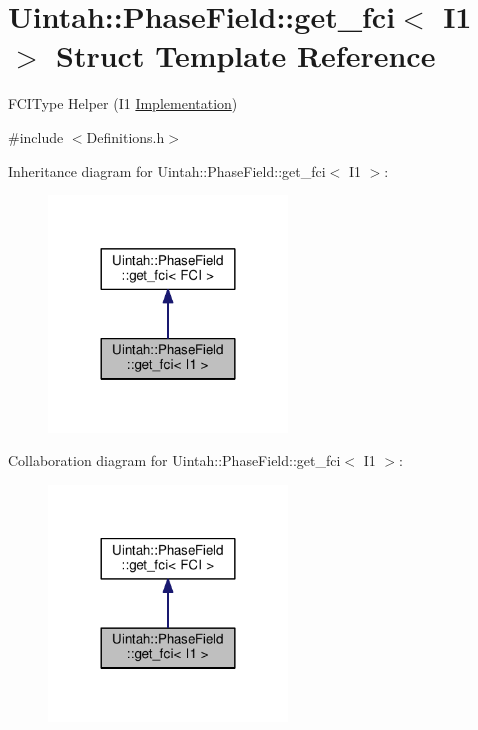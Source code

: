 \hypertarget{structUintah_1_1PhaseField_1_1get__fci_3_01I1_01_4}{}\section{Uintah\+:\+:Phase\+Field\+:\+:get\+\_\+fci$<$ I1 $>$ Struct Template Reference}
\label{structUintah_1_1PhaseField_1_1get__fci_3_01I1_01_4}


F\+C\+I\+Type Helper (I1 \hyperlink{classUintah_1_1PhaseField_1_1Implementation}{Implementation})  




{\ttfamily \#include $<$Definitions.\+h$>$}



Inheritance diagram for Uintah\+:\+:Phase\+Field\+:\+:get\+\_\+fci$<$ I1 $>$\+:\nopagebreak
\begin{figure}[H]
\begin{center}
\leavevmode
\includegraphics[width=180pt]{structUintah_1_1PhaseField_1_1get__fci_3_01I1_01_4__inherit__graph}
\end{center}
\end{figure}


Collaboration diagram for Uintah\+:\+:Phase\+Field\+:\+:get\+\_\+fci$<$ I1 $>$\+:\nopagebreak
\begin{figure}[H]
\begin{center}
\leavevmode
\includegraphics[width=180pt]{structUintah_1_1PhaseField_1_1get__fci_3_01I1_01_4__coll__graph}
\end{center}
\end{figure}
